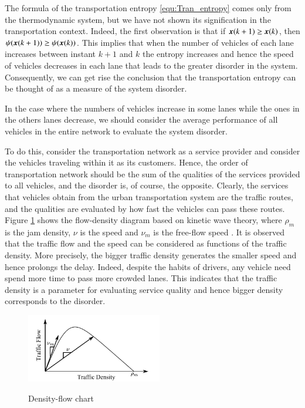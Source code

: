\documentclass[preprint,authoryear,12pt]{elsarticle}
\renewcommand{\vec}[1]{\mbox{\boldmath$#1$}}
\begin{document}
The formula of the transportation entropy \eqref{equ:Tran_entropy}
comes only from the thermodynamic system, but we have not shown its
signification in the transportation context. Indeed, the first observation 
  is that if $\vec{x}(k+1)\geq \vec{x}(k)$, then $\psi(\vec{x}(k+1))\geq \psi(\vec{x}(k))$. This implies that 
  when the number of
vehicles of each lane increases between instant $k+1$ and $k$ the entropy  increases and hence  the speed of vehicles decreases in each lane that leads to the
greater disorder in the system. Consequently, we can get rise the conclusion that
 the transportation entropy can be thought of as a measure of the system
disorder.

In the case where the numbers of vehicles increase in some lanes while
the ones in the others lanes decrease, we should consider the average
performance of all vehicles in the entire network to evaluate the
system disorder.

To do this, consider the
transportation network as a service provider and consider the
vehicles traveling within it as its customers. Hence, the order of
transportation network should be the sum of the qualities of the
services provided to all vehicles, and the disorder is, of course,
the opposite. Clearly, the services that vehicles obtain from the
urban transportation system are the traffic routes, and the qualities
are evaluated by how fast the vehicles can pass these routes. Figure
\ref{fig:d_q} shows the flow-density diagram based on kinetic wave
theory, where $\rho_m$ is the jam density, $\nu$ is the speed and
$\nu_m$ is the free-flow speed \citep{ukkusuri_robust_2010}. It is
observed that the traffic flow and the speed can be considered as
functions of the traffic density. More precisely, the bigger traffic
density generates the smaller speed and hence prolongs the delay.
Indeed, despite the habits of drivers, any vehicle need spend more
time to pass more crowded lanes. This indicates that the traffic
density is a parameter for evaluating service quality and hence
bigger density corresponds to the disorder.

\begin{figure}[ht]
  \centering
  \includegraphics[height=3cm]{pics/d-q}\\
  \caption{Density-flow chart}
  \label{fig:d_q}
\end{figure}
\end{document}
